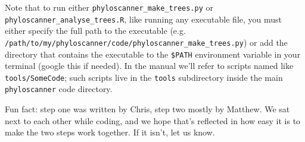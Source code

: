\documentclass{article}
\newcommand{\p}{\texttt{phyloscanner}\xspace}
\newcommand{\pmt}{\texttt{phyloscanner\_make\_trees.py}\xspace}
\newcommand{\pat}{\texttt{phyloscanner\_analyse\_trees.R}\xspace}
\let\c\texttt
\begin{document}
Note that to run either \pmt or \pat, like running any executable file, you must either specify the full path to the executable (e.g.\\\c{/path/to/my/phyloscanner/code/}\pmt) or add the directory that contains the executable to the \c{\$PATH} environment variable in your terminal (google this if needed).
In the manual we'll refer to scripts named like \c{tools/SomeCode}; such scripts live in the \c{tools} subdirectory inside the main \p code directory.


Fun fact: step one was written by Chris, step two mostly by Matthew.
We sat next to each other while coding, and we hope that's reflected in how easy it is to make the two steps work together.
If it isn't, let us know.







\end{document}
